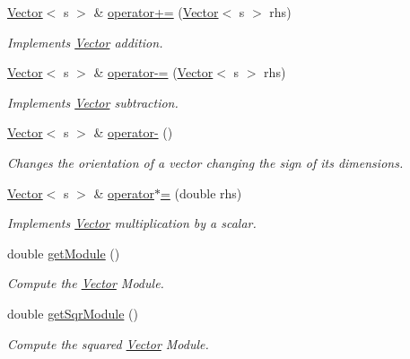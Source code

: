 \begin{DoxyCompactItemize}
\hyperlink{classzbe_1_1_vector}{Vector}$<$ s $>$ \& \hyperlink{classzbe_1_1_vector_ae506e73798e78b596dd43be34bfbdd73}{operator+=} (\hyperlink{classzbe_1_1_vector}{Vector}$<$ s $>$ rhs)
\begin{DoxyCompactList}\small\item\em Implements \hyperlink{classzbe_1_1_vector}{Vector} addition. \end{DoxyCompactList}\item 
\hyperlink{classzbe_1_1_vector}{Vector}$<$ s $>$ \& \hyperlink{classzbe_1_1_vector_a879b33b5c6c62bc16b771cc874614189}{operator-\/=} (\hyperlink{classzbe_1_1_vector}{Vector}$<$ s $>$ rhs)
\begin{DoxyCompactList}\small\item\em Implements \hyperlink{classzbe_1_1_vector}{Vector} subtraction. \end{DoxyCompactList}\item 
\hyperlink{classzbe_1_1_vector}{Vector}$<$ s $>$ \& \hyperlink{classzbe_1_1_vector_a215c195ff041f6e8230c5ce619174651}{operator-\/} ()
\begin{DoxyCompactList}\small\item\em Changes the orientation of a vector changing the sign of its dimensions. \end{DoxyCompactList}\item 
\hyperlink{classzbe_1_1_vector}{Vector}$<$ s $>$ \& \hyperlink{classzbe_1_1_vector_a7088f4ab907e75ce8ba529189917c5ca}{operator$\ast$=} (double rhs)
\begin{DoxyCompactList}\small\item\em Implements \hyperlink{classzbe_1_1_vector}{Vector} multiplication by a scalar. \end{DoxyCompactList}\item 
double \hyperlink{classzbe_1_1_vector_aaff6572fe9c7ccb0ede8d017a135f4c1}{get\+Module} ()
\begin{DoxyCompactList}\small\item\em Compute the \hyperlink{classzbe_1_1_vector}{Vector} Module. \end{DoxyCompactList}\item 
double \hyperlink{classzbe_1_1_vector_ad9f7babae7c512392583c36d9611140b}{get\+Sqr\+Module} ()
\begin{DoxyCompactList}\small\item\em Compute the squared \hyperlink{classzbe_1_1_vector}{Vector} Module. \end{DoxyCompactList}\end{DoxyCompactItemize}
